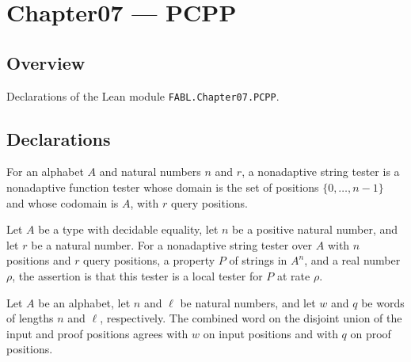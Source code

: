 \chapter{Chapter07 — PCPP}
\section{Overview}

Declarations of the Lean module \texttt{FABL.Chapter07.PCPP}.

\section{Declarations}

\begin{definition}
\label{FABL.NonadaptiveStringTester}
\leanok
{}
For an alphabet $A$ and natural numbers $n$ and $r$, a nonadaptive string tester is a
nonadaptive function tester whose domain is the set of positions $\{0,\ldots,n-1\}$
and whose codomain is $A$, with $r$ query positions.
\end{definition}

\begin{definition}
\label{FABL.IsLocalStringTester}
\leanok
{}
Let $A$ be a type with decidable equality, let $n$ be a positive natural number, and let
$r$ be a natural number. For a nonadaptive string tester over $A$ with $n$ positions and
$r$ query positions, a property $P$ of strings in $A^n$, and a real number $\rho$, the
assertion is that this tester is a local tester for $P$ at rate $\rho$.
\end{definition}

\begin{definition}
\label{FABL.inputProofWord}
\leanok
Let $A$ be an alphabet, let $n$ and $\ell$ be natural numbers, and let $w$ and $q$ be
words of lengths $n$ and $\ell$, respectively. The combined word on the disjoint union
of the input and proof positions agrees with $w$ on input positions and with $q$ on
proof positions.
\end{definition}

